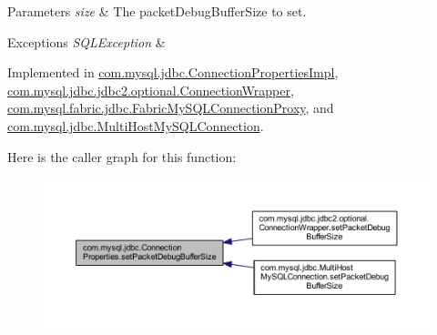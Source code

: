 \begin{DoxyParams}{Parameters}
{\em size} & The packet\+Debug\+Buffer\+Size to set. \\
\hline
\end{DoxyParams}

\begin{DoxyExceptions}{Exceptions}
{\em S\+Q\+L\+Exception} & \\
\hline
\end{DoxyExceptions}


Implemented in \mbox{\hyperlink{classcom_1_1mysql_1_1jdbc_1_1_connection_properties_impl_adbb96f1f13b761373e6fb46ac8cde113}{com.\+mysql.\+jdbc.\+Connection\+Properties\+Impl}}, \mbox{\hyperlink{classcom_1_1mysql_1_1jdbc_1_1jdbc2_1_1optional_1_1_connection_wrapper_aaf10a4fb7d7079348a8ad47aafc4dedb}{com.\+mysql.\+jdbc.\+jdbc2.\+optional.\+Connection\+Wrapper}}, \mbox{\hyperlink{classcom_1_1mysql_1_1fabric_1_1jdbc_1_1_fabric_my_s_q_l_connection_proxy_a03839feaf6f68fe1a40adff985aad9d9}{com.\+mysql.\+fabric.\+jdbc.\+Fabric\+My\+S\+Q\+L\+Connection\+Proxy}}, and \mbox{\hyperlink{classcom_1_1mysql_1_1jdbc_1_1_multi_host_my_s_q_l_connection_a40dfa273870f39c257a9eb9feaad70b0}{com.\+mysql.\+jdbc.\+Multi\+Host\+My\+S\+Q\+L\+Connection}}.

Here is the caller graph for this function\+:\nopagebreak
\begin{figure}[H]
\begin{center}
\leavevmode
\includegraphics[width=350pt]{interfacecom_1_1mysql_1_1jdbc_1_1_connection_properties_ae0414fc9a146276fb458dc6e6b423f98_icgraph}
\end{center}
\end{figure}
\mbox{\label{interfacecom_1_1mysql_1_1jdbc_1_1_connection_properties_a01cf4f506ad942b96a36708c33221a48}} 
